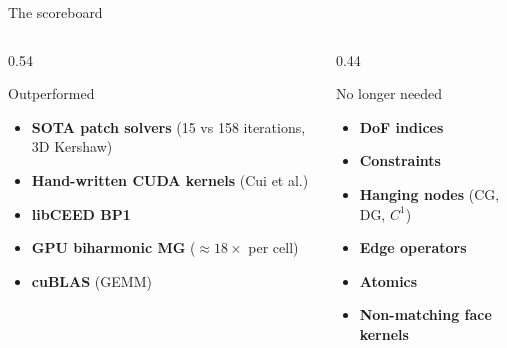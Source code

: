 \documentclass{beamer}
\begin{document}
\begin{frame}{The scoreboard}
    \begin{columns}[T]
        \begin{column}{0.54\textwidth}
            \begin{block}{Outperformed}
                \begin{itemize}
                    \small
                    \item[\checkmark] \textbf{SOTA patch solvers} (15 vs 158 iterations, 3D Kershaw) \pause
                    \item[\checkmark] \textbf{Hand-written CUDA kernels} (Cui et al.)
                    \item[\checkmark] \textbf{libCEED BP1}
                    \item[\checkmark] \textbf{GPU biharmonic MG} ($\approx 18\times$ per cell)
                          \pause
                    \item[\checkmark] \textbf{cuBLAS} (GEMM)
                \end{itemize}
            \end{block}
        \end{column}
        \begin{column}{0.44\textwidth}
            \pause
            \begin{block}{No longer needed}
                \begin{itemize}
                    \small
                    \item[$\varnothing$] \textbf{DoF indices}
                    \item[$\varnothing$] \textbf{Constraints}
                    \item[$\varnothing$] \textbf{Hanging nodes} (CG, DG, $C^1$)
                    \item[$\varnothing$] \textbf{Edge operators}
                    \item[$\varnothing$] \textbf{Atomics}
                    \item[$\varnothing$] \textbf{Non-matching face kernels}
                \end{itemize}
            \end{block}
        \end{column}
    \end{columns}
    \vfill
    \centering
\end{frame}
\end{document}
